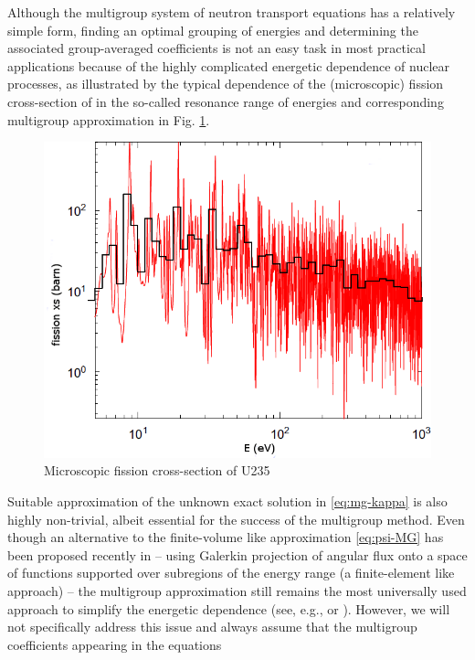 Although the multigroup system of neutron transport equations has a relatively simple form, finding an optimal grouping
of energies and determining the associated group-averaged coefficients is not an easy task in most practical
applications because of the highly complicated energetic dependence of nuclear processes, as illustrated by the
typical dependence of the (microscopic) fission cross-section of  in the so-called resonance range
of energies and corresponding multigroup approximation in Fig. \ref{fig:xs}.
\begin{figure}[htp]
\begin{center}
  \includegraphics[scale=.4]{U235fg}
  \caption{Microscopic fission cross-section of U235}
  \label{fig:xs}
\end{center}
\end{figure}
Suitable approximation of the unknown exact solution in \eqref{eq:mg-kappa} is also highly non-trivial, albeit essential
for the success of the multigroup method. Even though an alternative to the finite-volume like approximation
\eqref{eq:psi-MG} has been proposed recently  in \cite{Douglass} -- using Galerkin projection of angular flux onto a
space of functions supported over subregions of the energy range (a finite-element like approach) --  the multigroup approximation still remains the most universally used approach to simplify the energetic dependence (see, e.g., \cite[Chap.~5]{Cacuci1} or \cite{Cho1}). However, we will
not specifically address this issue and always assume that the multigroup coefficients appearing in the equations 

